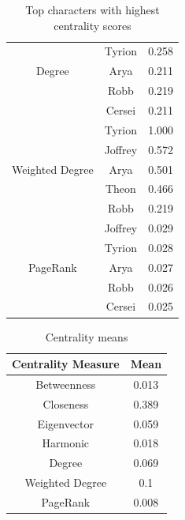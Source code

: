 \documentclass[10pt,twocolumn,letterpaper]{article}
\begin{document}
\begin{table}[!h]
\begin{tabular}{c|c|c}
                    & Tyrion & 0.258 \\
        Degree      & Arya & 0.211 \\
                    & Robb & 0.219 \\
                    & Cersei & 0.211 \\
        \hline
                    & Tyrion & 1.000 \\
                    & Joffrey & 0.572 \\
        Weighted Degree & Arya & 0.501 \\
                    & Theon & 0.466 \\
                    & Robb & 0.219 \\
        \hline
                    & Joffrey & 0.029 \\
                    & Tyrion & 0.028 \\
        PageRank    & Arya & 0.027 \\
                    & Robb & 0.026 \\
                    & Cersei & 0.025 \\
        \hline
    \end{tabular}
    \vspace{0.2cm}
    \caption{Top characters with highest centrality scores}
    \label{tab:my_label}
\end{table}

\begin{table}[!h]
    \centering
    \small
    \begin{tabular}{c|c}
        Centrality Measure & Mean  \\
        \hline
        Betweenness & 0.013 \\
        Closeness & 0.389 \\
        Eigenvector & 0.059 \\
        Harmonic & 0.018 \\
        Degree & 0.069 \\
        Weighted Degree & 0.1 \\
        PageRank & 0.008 \\
        \hline 
    \end{tabular} \\
    \caption{Centrality means}
    \label{tab:my_label}
\end{table}
\end{document}
